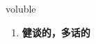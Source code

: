 
\begin{frame}
{\huge voluble}
\begin{center}
\begin{enumerate}\Large
  \item \textbf{健谈的，多话的}
\end{enumerate}
\end{center}
\end{frame}
